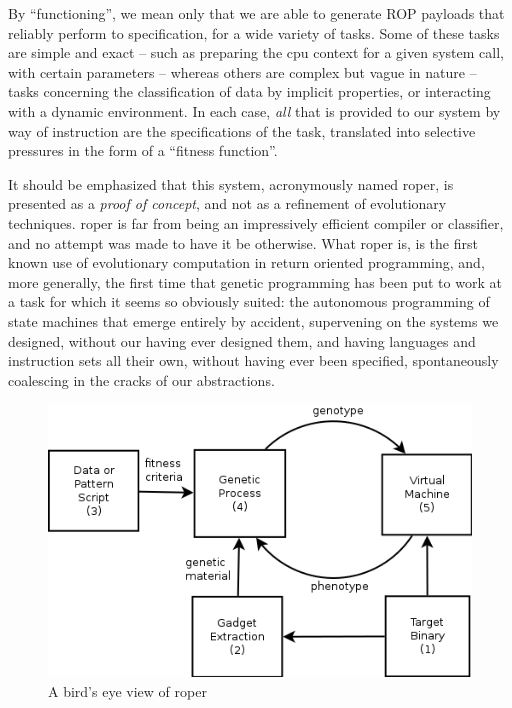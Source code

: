 \documentclass[12pt,glossary]{dalthesis}
\begin{document}
By ``functioning'', we mean only that we are able to generate
ROP payloads that reliably perform to specification, for a wide
variety of tasks. Some of these tasks are simple and exact
-- such as preparing the \gls{cpu} context for a given system call,
with certain parameters -- whereas others are complex but
vague in nature -- tasks concerning the classification of data
by implicit properties, or interacting with a dynamic environment.
In each case, \emph{all} that is provided to our system by way of
instruction are the specifications of the task, translated into
selective pressures in the form of a ``fitness function''.

It should be emphasized that this system, acronymously named \gls{roper}, is
presented as a \emph{proof of concept}, and not as a refinement of evolutionary
techniques. \gls{roper} is far from being an impressively efficient compiler or
classifier, and no attempt was made to have it be otherwise. What \gls{roper} is, is
the first known use of evolutionary computation in return oriented programming,
and, more generally, the first time that genetic programming has been put to
work at a task for which it seems so obviously suited: the autonomous
programming of state machines that emerge entirely by accident, supervening on
the systems we designed, without our having ever designed them, and having
languages and instruction sets all their own, without having ever been
specified, spontaneously coalescing in the cracks of our abstractions.

\begin{figure}[htbp]
\centering
\includegraphics[width=.9\linewidth]{../images/birdseye.png}
\caption{\label{fig:org27427cb}
A bird's eye view of \gls{roper}}
\end{figure}
\end{document}
